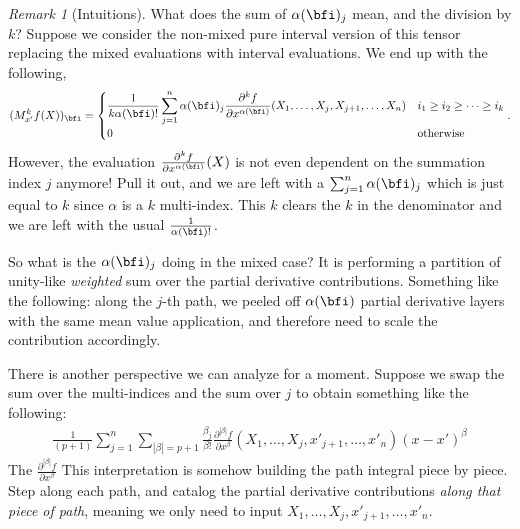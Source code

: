 \documentclass{article}
\theoremstyle{plain}
\theoremstyle{remark}
\newtheorem{remark}{Remark}
\begin{document}
\begin{remark}[Intuitions]
What does the sum of $\alpha(\bfi)_j$ mean, and the division by $k$?
Suppose we consider the non-mixed pure interval version of this tensor replacing the mixed evaluations with interval evaluations. We end up with the following,
\begin{align*}
    (M^k_{x'}f (X))_{\bfi} = \begin{cases}
        \displaystyle \frac{1}{k\alpha(\bfi)!} \sum_{j=1}^n \alpha(\bfi)_j \frac{\partial^{k} f}{\partial x^{\alpha(\bfi)}} (X_1,\dots,X_j,X_{j+1},\dots,X_n) & i_1 \geq i_2 \geq \cdots \geq i_k \\
        0 & \text{otherwise}
    \end{cases}.
\end{align*}
However, the evaluation $\frac{\partial^{k} f}{\partial x^{\alpha(\bfi)}} (X)$ is not even dependent on the summation index $j$ anymore! Pull it out, and we are left with a $\sum_{j=1}^n \alpha(\bfi)_j$ which is just equal to $k$ since $\alpha$ is a $k$ multi-index. This $k$ clears the $k$ in the denominator and we are left with the usual $\frac{1}{\alpha(\bfi)!}$.

So what is the $\alpha(\bfi)_j$ doing in the mixed case? It is performing a partition of unity-like \emph{weighted} sum over the partial derivative contributions. 
Something like the following: along the $j$-th path, we peeled off $\alpha(\bfi)$ partial derivative layers with the same mean value application, and therefore need to scale the contribution accordingly.

There is another perspective we can analyze for a moment. Suppose we swap the sum over the multi-indices and the sum over $j$ to obtain something like the following:
\begin{align*}
    \frac{1}{(p+1)}\sum_{j=1}^n \sum_{|\beta| = p+1} \frac{\beta_j}{\beta!} \frac{\partial^{|\beta|} f}{\partial x^\beta} (X_1,\dots,X_j,x'_{j+1},\dots,x'_n) (x - x')^\beta
\end{align*}
The $\frac{\partial^{|\beta|}f}{\partial x^\beta}$
This interpretation is somehow building the path integral piece by piece. Step along each path, and catalog the partial derivative contributions \emph{along that piece of path}, meaning we only need to input $X_1,\dots,X_j,x'_{j+1},\dots,x'_n$. 
\end{remark}


\newpage



\end{document}
